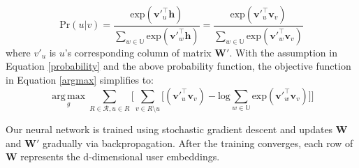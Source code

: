 \documentclass[sigconf]{acmart}
\begin{document}

\begin{equation}\label{softmax}
\text{Pr}(u|v) = \frac{\text{exp}({\textbf{v}'^{\top}_u\textbf{h}})}{\sum\limits_{w\in\mathbb{U}}{\text{exp}({\textbf{v}'^{\top}_w\textbf{h}})}}=\frac{\text{exp}({\textbf{v}'^{\top}_u\textbf{v}_v})}{\sum\limits_{w\in\mathbb{U}}{\text{exp}({\textbf{v}'^{\top}_w\textbf{v}_v})}}
\end{equation}
where $v'_u$ is $u$'s corresponding column of matrix $\textbf{W}'$. With the assumption in Equation \ref{probability} and the above probability function, the objective function in Equation \ref{argmax} simplifies to:
\begin{equation}\label{simplified_argmax}
{\operatorname*{arg\,max}_g\sum_{R\in\mathcal{R},u\in{R}}{\Big[\sum_{v\in{R}\setminus{u}}{\big[(\textbf{v}'^{\top}_u\textbf{v}_v)-\text{log}{\sum\limits_{w\in\mathbb{U}}{\text{exp}({\textbf{v}'^{\top}_w\textbf{v}_v})}}\big]} \Big]}}
\end{equation}




Our neural network is trained using stochastic gradient descent and updates $\textbf{W}$ and $\textbf{W}'$ gradually via backpropagation. After the training converges, each row of $\textbf{W}$ represents the d-dimensional user embeddings. %
\end{document}
